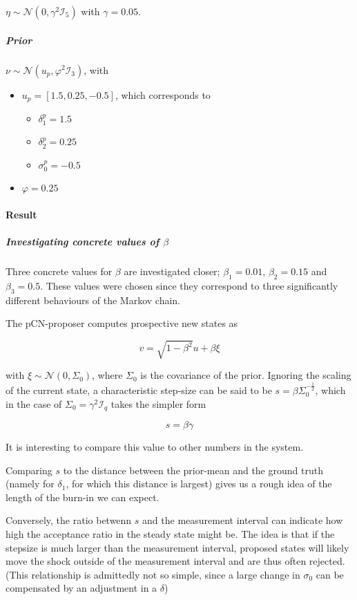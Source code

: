 \documentclass[11pt]{article}
\newcommand{\I}{{\mathcal{I}}}
\newcommand{\N}[2]{\mathcal{N}\left(#1,#2\right)}
\begin{document}
\(\eta \sim \N{0}{\gamma^2 \I_5}\) with \(\gamma = 0.05\).

\subparagraph{Prior}
\label{sec:orgf7d5f8d}

\(\nu \sim \N{u_p}{\varphi^2 \I_3}\), with
\begin{itemize}
\item \(u_p = [1.5, 0.25, -0.5]\),
which corresponds to
\begin{itemize}
\item \(\delta_1^p = 1.5\)
\item \(\delta_2^p = 0.25\)
\item \(\sigma_0^p = -0.5\)
\end{itemize}
\item \(\varphi = 0.25\)
\end{itemize}

\paragraph{Result}
\label{sec:orgc200912}

\subparagraph{Investigating concrete values of \(\beta\)}
\label{sec:org051ecf1}

Three concrete values for \(\beta\) are investigated closer; \(\beta_1 = 0.01\), \(\beta_2 = 0.15\)
and \(\beta_3 = 0.5\). These values were chosen since they correspond to three significantly
different behaviours of the Markov chain.

The pCN-proposer computes prospective new states as

$$v = \sqrt{1-\beta^2} u + \beta \xi$$

with \(\xi \sim \N{0}{\Sigma_0}\), where \(\Sigma_0\) is the covariance of the prior. Ignoring the
scaling of the current state, a characteristic step-size can be said to be \(s = \beta \Sigma_0^{-\frac{1}{2}}\),
which in the case of \(\Sigma_0 = \gamma^2 \I_q\) takes the simpler form

\begin{equation}
\label{eqn:char_step}
  s = \beta \gamma
\end{equation}

It is interesting to compare this value to other numbers in the system.

Comparing \(s\) to the distance between the prior-mean and the ground truth (namely for \(\delta_{\text{1}}\),
for which this distance is largest) gives us a rough idea of the length of the burn-in we
can expect.

Conversely, the ratio betwenn \(s\) and the measurement interval can indicate how high the acceptance
ratio in the steady state might be.
The idea is that if the stepsize is much larger than the measurement interval, proposed states will
likely move the shock outside of the measurement interval and are thus often rejected. (This
relationship is admittedly not so simple, since a large change in \(\sigma_{\text{0}}\) can be compensated
by an adjustment in a \(\delta\))
\end{document}
